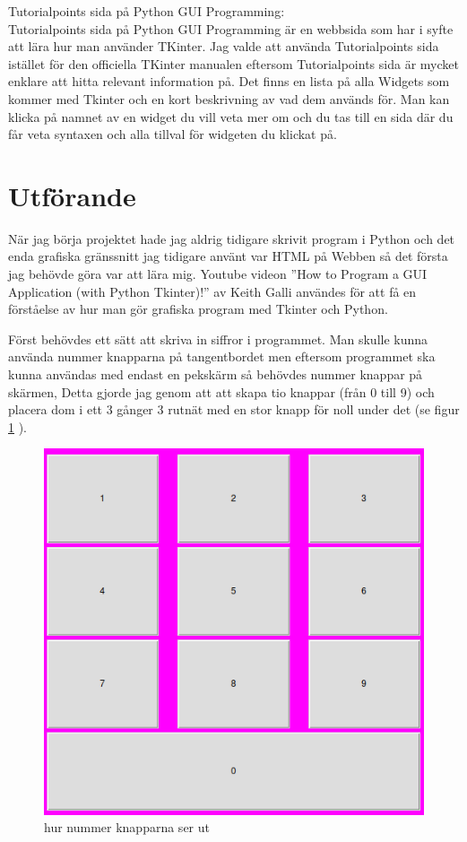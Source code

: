 \documentclass[a4paper, 12pt]{article}
\begin{document}
Tutorialpoints sida på Python GUI Programming:\\
Tutorialpoints sida på Python GUI Programming är en webbsida som har i syfte att lära hur man använder TKinter.
Jag valde att använda Tutorialpoints sida istället för den officiella TKinter manualen eftersom Tutorialpoints sida är mycket enklare att hitta relevant information på. Det finns en lista på alla Widgets som kommer med Tkinter och en kort beskrivning av vad dem används för. Man kan klicka på namnet av en widget du vill veta mer om och du tas till en sida där du får veta syntaxen och alla tillval för widgeten du klickat på.

\section{Utförande}

När jag börja projektet hade jag aldrig tidigare skrivit program i Python och det enda grafiska gränssnitt jag tidigare använt var HTML på Webben så det första jag behövde göra var att lära mig.
Youtube videon ''How to Program a GUI Application (with Python Tkinter)!'' av Keith Galli\cite{yt:galli} användes för att få en förståelse av hur man gör grafiska program med Tkinter och Python. 


Först behövdes ett sätt att skriva in siffror i programmet.
Man skulle kunna använda nummer knapparna på tangentbordet men eftersom programmet ska kunna användas med endast en pekskärm så behövdes nummer knappar på skärmen, Detta gjorde jag genom att att skapa tio knappar (från 0 till 9)  och placera dom i ett 3 gånger 3 rutnät med en stor knapp för noll under det (se figur \ref{fig:numpad} ).


\begin{figure}[h!]
 \centering
  \includegraphics[width=0.5\linewidth]{img/numpad.png}
  \caption{hur nummer knapparna ser ut}
  \label{fig:numpad}
\end{figure}
\end{document}
